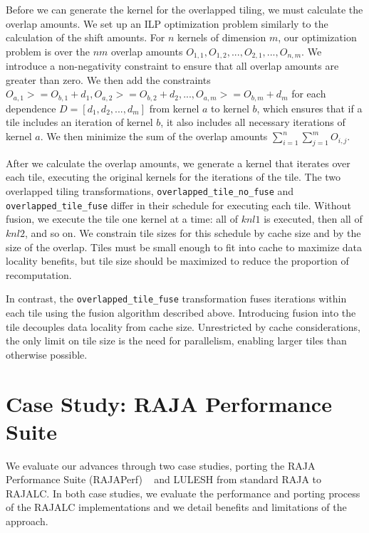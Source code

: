 Before we can generate the kernel for the overlapped tiling, we must
calculate the overlap amounts. 
We set up an ILP optimization problem similarly to the calculation of the
shift amounts.
For $n$ kernels of dimension $m$, our optimization problem is over the $nm$
overlap amounts $O_{1,1},O_{1,2},...,O_{2,1},...,O_{n,m}$.
We introduce a non-negativity constraint to ensure that all overlap amounts
are greater than zero. 
We then add the constraints
$O_{a,1} >= O_{b,1} + d_{1}, O_{a,2} >= O_{b,2} + d_{2},...,O_{a,m} >= O_{b,m} + d_{m}$
for each dependence $D=[d_{1},d_{2},...,d_{m}]$ from kernel $a$ to kernel $b$,
which ensures that if a tile includes an iteration of kernel $b$, it also
includes all necessary iterations of kernel $a$.
We then minimize the sum of the overlap amounts
$\sum_{i=1}^{n} \sum_{j=1}^{m} O_{i,j}$.

After we calculate the overlap amounts, we generate a kernel that iterates
over each tile, executing the original kernels for the iterations of the tile.
The two overlapped tiling transformations, \verb.overlapped_tile_no_fuse.
and \verb.overlapped_tile_fuse. differ in their schedule for executing each
tile.
Without fusion, we execute the tile one kernel at a time: all of $knl1$ is
executed, then all of $knl2$, and so on. 
We constrain tile sizes for this schedule by cache size and by the size of
the overlap. 
Tiles must be small enough to fit into cache to maximize data locality
benefits, but tile size should be maximized to reduce the proportion of
recomputation.

In contrast, the \verb.overlapped_tile_fuse. transformation fuses iterations
within each tile using the fusion algorithm described above.
Introducing fusion into the tile decouples data locality from cache size.
Unrestricted by cache considerations, the only limit on tile size is the
need for parallelism, enabling larger tiles than otherwise possible.



\section{Case Study: RAJA Performance Suite}

We evaluate our advances through two case studies, porting the RAJA
Performance Suite (RAJAPerf) ~\cite{hornung2017raja} and  LULESH from
standard RAJA to RAJALC.
In both case studies, we evaluate the performance and porting process
of the RAJALC implementations and we detail benefits and limitations
of the approach.

